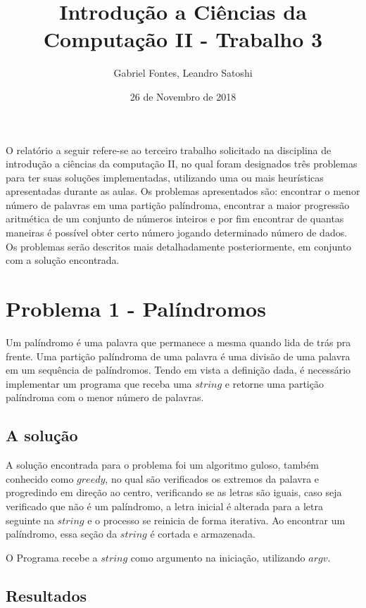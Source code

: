 \documentclass[letterpaper,12pt]{article}
\begin{document}
\title{Introdução a Ciências da Computação II - Trabalho 3}
\author{Gabriel Fontes, Leandro Satoshi}
\date{26 de Novembro de 2018}
\maketitle

O relatório a seguir refere-se ao terceiro trabalho solicitado na disciplina de introdução a ciências da computação II, no qual foram designados três problemas para ter suas soluções implementadas, utilizando uma ou mais heurísticas apresentadas durante as aulas. Os problemas apresentados são: encontrar o menor número de palavras em uma partição palíndroma, encontrar a maior progressão aritmética de um conjunto de números inteiros e por fim encontrar de quantas maneiras é possível obter certo número jogando determinado número de dados. Os problemas serão descritos mais detalhadamente posteriormente, em conjunto com a solução encontrada.



\section{Problema 1 - Palíndromos}

Um palíndromo é uma palavra que permanece a mesma quando lida de trás pra frente. Uma partição palíndroma de uma palavra é uma divisão de uma palavra em um sequência de palíndromos. Tendo em vista a definição dada, é necessário implementar um programa que receba uma $string$ e retorne uma partição palíndroma com o menor número de palavras.
 
\subsection{A solução}

A solução encontrada para o problema foi um algoritmo guloso, também conhecido como $greedy$, no qual são verificados os extremos da palavra e progredindo em direção ao centro, verificando se as letras são iguais, caso seja verificado que não é um palíndromo, a letra inicial é alterada para a letra seguinte na $string$ e o processo se reinicia de forma iterativa. Ao encontrar um palíndromo, essa seção da $string$ é cortada e armazenada.

O Programa recebe a $string$ como argumento na iniciação, utilizando $argv$.

\subsection{Resultados}
\end{document}
